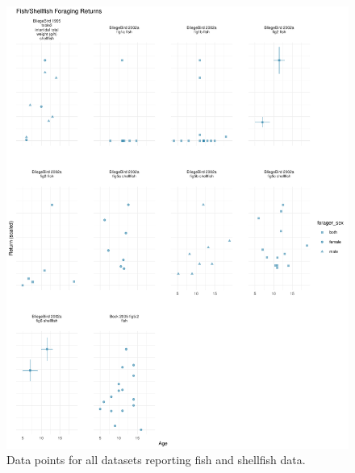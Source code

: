 \begin{figure}[h]
\centering
\includegraphics[width=12cm] {text/images/supplementary/fishshellfish_data.pdf}
\renewcommand{\thefigure}{S\arabic{figure}}
\caption{Data points for all datasets reporting fish and shellfish data.}
\label{fig:fish}
\end{figure}

